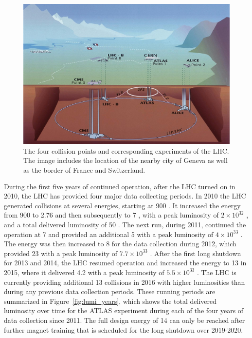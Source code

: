 \begin{figure}
\centering
\includegraphics[width=\fullfig]{figures/cern_locations.jpg}
\caption{The four collision points and corresponding experiments of the \ac{LHC}. The image includes the location of the nearby city of Geneva as well as the border of France and Switzerland.}
\label{fig:cern_locations}
\end{figure}

During the first five years of continued operation, after the \ac{LHC} turned on in 2010, the \ac{LHC} has provided four major data collecting periods.
In 2010 the \ac{LHC} generated collisions at several energies, starting at 900 \GeV. 
It increased the energy from 900 \GeV to 2.76 \TeV and then subsequently to 7 \TeV, with a peak luminosity of $2 \times 10^{32}$ \lcms, and a total delivered luminosity of 50 \ipb.
The next run, during 2011, continued the operation at 7 \TeV and provided an additional 5 \ifb with a peak luminosity of $4 \times 10^{33}$ \lcms. 
The energy was then increased to 8 \TeV for the data collection during 2012, which provided 23 \ifb with a peak luminosity of $7.7 \times 10^{33}$ \lcms.
After the first long shutdown for 2013 and 2014, the \ac{LHC} resumed operation and increased the energy to 13 \TeV in 2015, where it delivered 4.2 \ifb with a peak luminosity of $5.5 \times 10^{33}$ \lcms. 
The \ac{LHC} is currently providing additional 13 \TeV collisions in 2016 with higher luminosities than during any previous data collection periods.
These running periods are summarized in Figure~\ref{fig:lumi_years}, which shows the total delivered luminosity over time for the ATLAS experiment during each of the four years of data collection since 2011.
The full design energy of 14 \TeV can only be reached after further magnet training that is scheduled for the long shutdown over 2019-2020.

